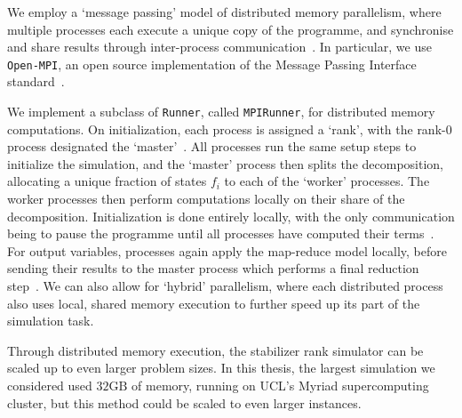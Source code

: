 We employ a `message passing' model of distributed memory parallelism, where multiple processes each execute a unique copy of the programme, and synchronise and share results through inter-process communication~\cite{Kessler2007}. In particular, we use \texttt{Open-MPI}, an open source implementation of the Message Passing Interface standard~\cite{OpenMPI,MPIForum}.\par
We implement a subclass of \texttt{Runner}, called \texttt{MPIRunner}, for distributed memory computations. On initialization, each process is assigned a `rank', with the rank-0 process designated the `master'~\cite{MPIForum}. All processes run the same setup steps to initialize the simulation, and the `master' process then splits the decomposition, allocating a unique fraction of states $f_{i}$ to each of the `worker' processes. The worker processes then perform computations locally on their share of the decomposition. Initialization is done entirely locally, with the only communication being to pause the programme until all processes have computed their terms~\cite{MPIForum}. For output variables, processes again apply the map-reduce model locally, before sending their results to the master process which performs a final reduction step~\cite{MPIForum}. We can also allow for `hybrid' parallelism, where each distributed process also uses local, shared memory execution to further speed up its part of the simulation task.\par
Through distributed memory execution, the stabilizer rank simulator can be scaled up to even larger problem sizes. In this thesis, the largest simulation we considered used $32\mathrm{GB}$ of memory, running on UCL's Myriad supercomputing cluster, but this method could be scaled to even larger instances.
